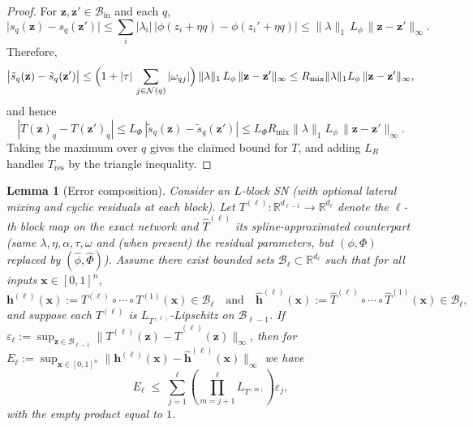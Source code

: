 \documentclass{article}
\theoremstyle{plain}
\newtheorem{lemma}{Lemma}
\theoremstyle{definition}
\theoremstyle{remark}
\begin{document}
\begin{proof}
For $\mathbf{z},\mathbf{z}'\in\mathcal{B}_{\mathrm{in}}$ and each $q$,
$$\bigl|s_q(\mathbf{z})-s_q(\mathbf{z}')\bigr|
\le \sum_i |\lambda_i|\,\bigl|\phi(z_i+\eta q)-\phi(z_i'+\eta q)\bigr|
\le \|\lambda\|_1\,L_\phi\,\|\mathbf{z}-\mathbf{z}'\|_\infty.$$
Therefore,
$$\bigl|\tilde s_q(\mathbf{z})-\tilde s_q(\mathbf{z}')\bigr|
\le \Bigl(1+|\tau|\,\sum_{j\in\mathcal{N}(q)}|\omega_{qj}|\Bigr)\,\|\lambda\|_1\,L_\phi\,\|\mathbf{z}-\mathbf{z}'\|_\infty
\le R_{\mathrm{mix}}\|\lambda\|_1 L_\phi\,\|\mathbf{z}-\mathbf{z}'\|_\infty,$$
and hence
$$|T(\mathbf{z})_q-T(\mathbf{z}')_q|
\le L_\Phi\,|\tilde s_q(\mathbf{z})-\tilde s_q(\mathbf{z}')|
\le L_\Phi R_{\mathrm{mix}}\|\lambda\|_1 L_\phi\,\|\mathbf{z}-\mathbf{z}'\|_\infty.$$
Taking the maximum over $q$ gives the claimed bound for $T$, and adding $L_R$ handles $T_{\mathrm{res}}$ by the triangle inequality.
\end{proof}

\begin{lemma}[Error composition]\label{lem:error_composition}
Consider an $L$-block SN (with optional lateral mixing and cyclic residuals at each block). Let $T^{(\ell)}:\mathbb{R}^{d_{\ell-1}}\to\mathbb{R}^{d_{\ell}}$ denote the $\ell$-th block map on the exact network and $\hat T^{(\ell)}$ its spline-approximated counterpart (same $\lambda,\eta,\alpha,\tau,\omega$ and (when present) the residual parameters, but $(\phi,\Phi)$ replaced by $(\hat\phi,\hat\Phi)$). Assume there exist bounded sets $\mathcal{B}_{\ell}\subset\mathbb{R}^{d_{\ell}}$ such that for all inputs $\mathbf{x}\in[0,1]^n$,
$$\mathbf{h}^{(\ell)}(\mathbf{x}) := T^{(\ell)}\!\circ\cdots\circ T^{(1)}(\mathbf{x}) \in \mathcal{B}_{\ell}
\quad\text{and}\quad
\hat{\mathbf{h}}^{(\ell)}(\mathbf{x}) := \hat T^{(\ell)}\!\circ\cdots\circ \hat T^{(1)}(\mathbf{x}) \in \mathcal{B}_{\ell},$$
and suppose each $T^{(\ell)}$ is $L_{T^{(\ell)}}$-Lipschitz on $\mathcal{B}_{\ell-1}$. If $\varepsilon_\ell:=\sup_{\mathbf{z}\in\mathcal{B}_{\ell-1}}\|T^{(\ell)}(\mathbf{z})-\hat T^{(\ell)}(\mathbf{z})\|_\infty$, then for $E_\ell:=\sup_{\mathbf{x}\in[0,1]^n}\|\mathbf{h}^{(\ell)}(\mathbf{x})-\hat{\mathbf{h}}^{(\ell)}(\mathbf{x})\|_\infty$ we have
\begin{equation}\label{eq:error_composition_result}
E_\ell \;\le\; \sum_{j=1}^{\ell}\left(\prod_{m=j+1}^{\ell} L_{T^{(m)}}\right)\varepsilon_j,
\end{equation}
with the empty product equal to $1$.
\end{lemma}
\end{document}
